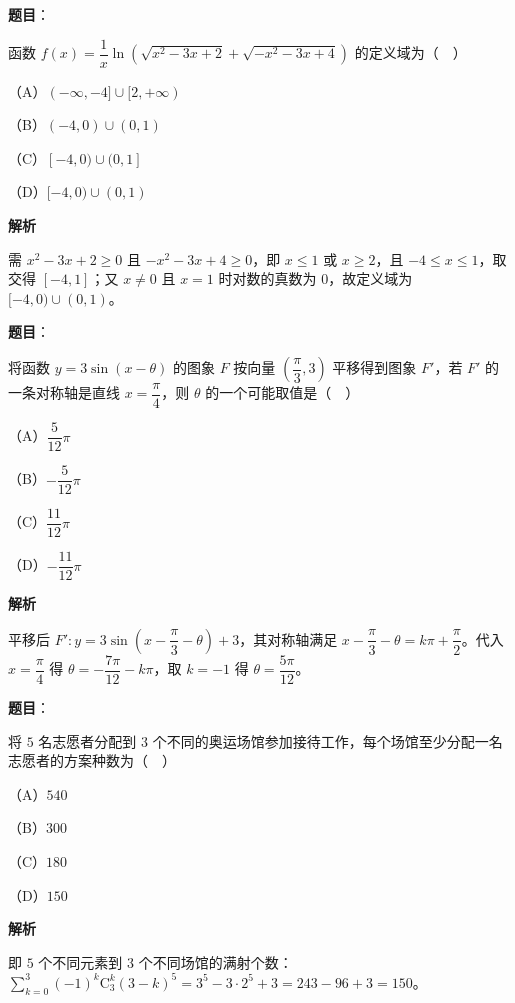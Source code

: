 \begin{answer}

\textbf{题目}：

函数 $f(x)=\dfrac1x\ln\left(\sqrt{x^2-3x+2}+\sqrt{-x^2-3x+4}\right)$ 的定义域为（　）

（A）$(-\infty,-4]\cup[2,+\infty)$

（B）$(-4,0)\cup(0,1)$

（C）$[-4,0)\cup(0,1]$

（D）$[-4,0)\cup(0,1)$

\textbf{解析}

需 $x^2-3x+2\geqslant0$ 且 $-x^2-3x+4\geqslant0$，即 $x\leqslant1$ 或 $x\geqslant2$，且 $-4\leqslant x\leqslant1$，取交得 $[-4,1]$；又 $x\neq0$ 且 $x=1$ 时对数的真数为 $0$，故定义域为 $[-4,0)\cup(0,1)$。


\end{answer}
\begin{answer}

\textbf{题目}：

将函数 $y=3\sin(x-\theta)$ 的图象 $F$ 按向量 $\left(\dfrac{\pi}3,3\right)$ 平移得到图象 $F'$，若 $F'$ 的一条对称轴是直线 $x=\dfrac{\pi}4$，则 $\theta$ 的一个可能取值是（　）

（A）$\dfrac5{12}\pi$

（B）$-\dfrac5{12}\pi$

（C）$\dfrac{11}{12}\pi$

（D）$-\dfrac{11}{12}\pi$

\textbf{解析}

平移后 $F':y=3\sin\left(x-\dfrac\pi3-\theta\right)+3$，其对称轴满足 $x-\dfrac\pi3-\theta=k\pi+\dfrac\pi2$。代入 $x=\dfrac\pi4$ 得 $\theta=-\dfrac{7\pi}{12}-k\pi$，取 $k=-1$ 得 $\theta=\dfrac{5\pi}{12}$。


\end{answer}
\begin{answer}

\textbf{题目}：

将 $5$ 名志愿者分配到 $3$ 个不同的奥运场馆参加接待工作，每个场馆至少分配一名志愿者的方案种数为（　）

（A）$540$

（B）$300$

（C）$180$

（D）$150$

\textbf{解析}

即 $5$ 个不同元素到 $3$ 个不同场馆的满射个数：$\displaystyle\sum_{k=0}^{3}(-1)^k\mathrm C_3^k(3-k)^5=3^5-3\cdot2^5+3=243-96+3=150$。


\end{answer}
